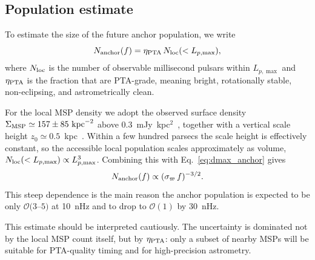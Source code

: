 \documentclass[aps,prx,twocolumn,superscriptaddress,nofootinbib,longbibliography]{revtex4-2}
\begin{document}
\subsection{Population estimate}\label{app:population}

To estimate the size of the future anchor population, we write
\begin{equation}\label{eq:Nanchor_def}
N_{\rm anchor}(f) = \eta_{\rm PTA}\,N_{\rm loc}(<L_{p,\max}),
\end{equation}
where $N_{\rm loc}$ is the number of observable millisecond pulsars within $L_{p,\max}$ and $\eta_{\rm PTA}$ is the fraction that are PTA-grade, meaning bright, rotationally stable, non-eclipsing, and astrometrically clean.

For the local MSP density we adopt the observed surface density $\Sigma_{\rm MSP}\simeq157\pm85~{\rm kpc}^{-2}$ above $0.3$~mJy~kpc$^2$~\cite{Lyne1998}, together with a vertical scale height $z_0\simeq0.5$~kpc~\cite{Levin2013}. Within a few hundred parsecs the scale height is effectively constant, so the accessible local population scales approximately as volume, $N_{\rm loc}(<L_{p,\max})\propto L_{p,\max}^3$. Combining this with Eq.~\eqref{eq:dmax_anchor} gives
\begin{equation}\label{eq:Nanchor_scaling}
N_{\rm anchor}(f)\propto(\sigma_\varpi\,f)^{-3/2}.
\end{equation}
This steep dependence is the main reason the anchor population is expected to be only $\mathcal{O}(3$--$5)$ at 10~nHz and to drop to $\mathcal{O}(1)$ by 30~nHz.

This estimate should be interpreted cautiously. The uncertainty is dominated not by the local MSP count itself, but by $\eta_{\rm PTA}$: only a subset of nearby MSPs will be suitable for PTA-quality timing and for high-precision astrometry.
\end{document}
